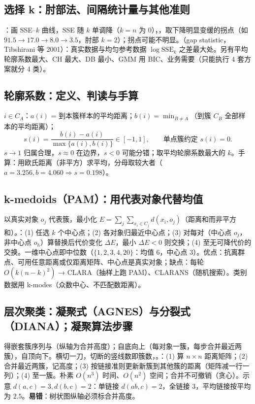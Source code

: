 \subsection{选择 k：肘部法、间隔统计量与其他准则}
：画 SSE–$k$ 曲线，SSE 随 $k$ 单调降（$k=n$ 为 0），，取下降明显变缓的拐点（如 $91.5\to17.0\to8.0\to3.5$，肘部 $k=2$）；拐点可能不明显。（gap statistic，Tibshirani 等 2001）：真实数据与均匀参考数据 $\log\mathrm{SSE}_k$ 之差最大处。另有平均轮廓系数最大、CH 最大、DB 最小、GMM 用 BIC、业务需要（只能执行 4 套方案就分 4 类）。

\subsection{轮廓系数：定义、判读与手算}
$i\in C_A$：$a(i)$ = 到本簇样本的平均距离；$b(i)=\min_{B\neq A}$（到簇 $C_B$ 全部样本的平均距离）；
\[s(i)=\frac{b(i)-a(i)}{\max\{a(i),b(i)\}}\in[-1,1],\qquad \text{单点簇约定 }s(i)=0.\]$s\to1$ 归属合理，$s\approx0$ 在边界，$s<0$ 可能分错；取平均轮廓系数最大的 $k$。手算：用欧氏距离（非平方）求平均，分母取较大者（$a=3.256,b=4.060\Rightarrow s=0.198$）。

\subsection{k-medoids（PAM）：用代表对象代替均值}
以真实对象 $o_j$ 代表簇，最小化 $E=\sum_j\sum_{x_i\in C_j}d(x_i,o_j)$（距离和而非平方和）。：(1) 任选 $k$ 个中心点；(2) 各对象归最近中心点；(3) 对每对（中心点 $o_j$，非中心点 $o_h$）算替换后代价变化 $\Delta E$，最小 $\Delta E<0$ 则交换；(4) 至无可降代价的交换。一维中心点即中位数（$\{1,2,3,4,20\}$：均值 6，中心点 3）。优点：抗离群点、可用任意距离或仅距离矩阵、中心点是真实对象；缺点：每轮 $O(k(n-k)^2)$ → CLARA（抽样上跑 PAM）、CLARANS（随机搜索）。类别数据用 k-modes（众数中心、不匹配数距离）。

\subsection{层次聚类：凝聚式（AGNES）与分裂式（DIANA）；凝聚算法步骤}
得嵌套簇序列与（纵轴为合并高度）；自底向上（每对象一簇，每步合并最近两簇），自顶向下。横切一刀，切断的竖线数即簇数，。：(1) 算 $n\times n$ 距离矩阵；(2) 合并最近两簇，记高度；(3) 按链接准则更新新簇到其他簇的距离（矩阵减一行一列）；(4) 至一簇。朴素 $O(n^3)$ 时间、$O(n^2)$ 空间；合并不可撤销（贪心）。示意 $d(a,c)=3,d(b,c)=2$：单链接 $d(ab,c)=2$，全链接 $3$，平均链接按平均为 $2.5$。\textbf{易错}：树状图纵轴必须标合并高度。

